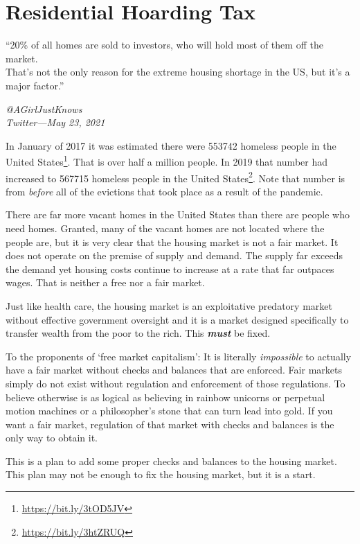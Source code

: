\section{Residential Hoarding Tax}

\epigraph{``20\% of all homes are sold to investors, who will hold most of them off the market.\\[1\baselineskip] That's not the only reason for the extreme housing shortage in the US, but it's a major factor.''}{\textit{@AGirlJustKnows \\ Twitter---May 23, 2021}}

\noindent In January of 2017 it was estimated there were \num[group-separator={,}]{553742} homeless people in the United States\footnote{\url{https://bit.ly/3tOD5JV}}. That is over half a million people. In 2019 that number had increased to \num[group-separator={,}]{567715} homeless people in the United States\footnote{\url{https://bit.ly/3htZRUQ}}. Note that number is from \emph{before} all of the evictions that took place as a result of the \covid{} pandemic.

There are far more vacant homes in the United States than there are people who need homes. Granted, many of the vacant homes are not located where the people are, but it is very clear that the housing market is not a fair market. It does not operate on the premise of supply and demand. The supply far exceeds the demand yet housing costs continue to increase at a rate that far outpaces wages. That is neither a free nor a fair market.

Just like health care, the housing market is an exploitative predatory market without effective government oversight and it is a market designed specifically to transfer wealth from the poor to the rich. This \textbf{\emph{must}} be fixed.

To the proponents of `free market capitalism': It is literally \emph{impossible} to actually have a fair market without checks and balances that are enforced. Fair markets simply do not exist without regulation and enforcement of those regulations. To believe otherwise is as logical as believing in rainbow unicorns or perpetual motion machines or a philosopher's stone that can turn lead into gold. If you want a fair market, regulation of that market with checks and balances is the only way to obtain it.

This is a plan to add some proper checks and balances to the housing market. This plan may not be enough to fix the housing market, but it is a start.

